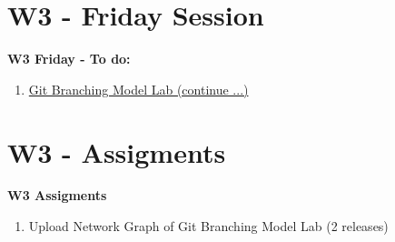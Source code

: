 \documentclass{beamer}
\begin{document}
\section{W3 - Friday Session }

\begin{frame}

\textbf{W3 Friday - To do:}

\begin{enumerate}
\item
	\href{https://github.com/adsoftsito/tdd/blob/master/w3/gitbranchinglab.pdf}{Git Branching Model Lab (continue ...)} 

\end{enumerate} 


\end{frame}



\section{W3 - Assigments }

\begin{frame}


\textbf{W3 Assigments}


\begin{enumerate}
\item
	 
	Upload Network Graph of Git Branching Model Lab (2 releases)

\end{enumerate} 


\end{frame}
\end{document}
